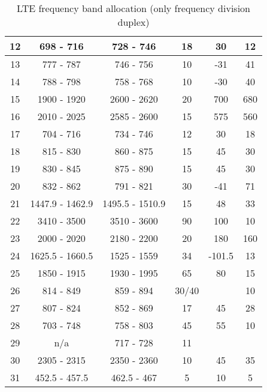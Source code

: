 \begin{table}[]
\begin{tabular}{|c|c|c|c|c|c|}
    12 & 698 - 716   & 728 - 746   & 18 & 30  & 12  \\ \hline
    13 & 777 - 787   & 746 - 756   & 10 & -31  & 41  \\ \hline
    14 & 788 - 798   & 758 - 768   & 10 & -30  & 40  \\ \hline
    15 & 1900 - 1920 & 2600 - 2620 & 20 & 700  & 680  \\ \hline
    16 & 2010 - 2025 & 2585 - 2600 & 15 & 575 & 560 \\ \hline
    17 & 704 - 716   & 734 - 746   & 12 & 30  & 18  \\ \hline
    18 & 815 - 830   & 860 - 875   & 15 & 45  & 30  \\ \hline
    19 & 830 - 845   & 875 - 890   & 15 & 45  & 30  \\ \hline
    20 & 832 - 862   & 791 - 821   & 30 & -41  & 71  \\ \hline
    21 & 1447.9 - 1462.9 & 1495.5 - 1510.9 & 15 & 48  & 33  \\ \hline
    22 & 3410 - 3500 & 3510 - 3600 & 90 & 100  & 10  \\ \hline
    23 & 2000 - 2020 & 2180 - 2200 & 20 & 180  & 160  \\ \hline
    24 & 1625.5 - 1660.5 & 1525 - 1559 & 34 & -101.5  & 13  \\ \hline
    25 & 1850 - 1915 & 1930 - 1995 & 65 & 80  & 15  \\ \hline
    26 & 814 - 849   & 859 - 894   & 30/40 &     & 10  \\ \hline
    27 & 807 - 824   & 852 - 869   & 17 & 45  & 28  \\ \hline
    28 & 703 - 748   & 758 - 803   & 45 & 55  & 10  \\ \hline
    29 & n/a         & 717 - 728   & 11 &     &     \\ \hline
    30 & 2305 - 2315 & 2350 - 2360 & 10 & 45  & 35  \\ \hline
    31 & 452.5 - 457.5 & 462.5 - 467 & 5  & 10  & 5   \\ \hline
  \end{tabular}
  \caption{LTE frequency band allocation (only frequency division duplex) \cite{radio2015electronics}}
  \label{tab:ltefreqband}
\end{table}

